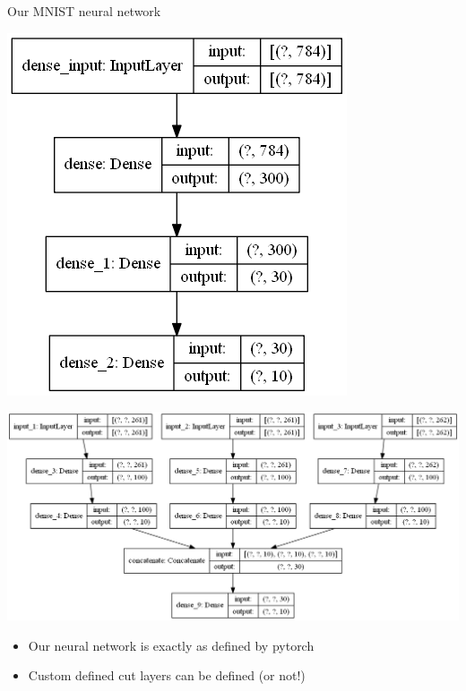 \documentclass[xcolor=dvipsnames]{beamer}
\begin{document}
\begin{frame}{Our MNIST neural network}
\begin{minipage}{.3\textwidth}
  \centering
  \includegraphics[width=1\linewidth]{images/combinedmodel.png}
  \label{fig:test1}
\end{minipage}%
\begin{minipage}{.7\textwidth}
  \centering
  \includegraphics[width=1\linewidth]{images/splitmodel.png}
  \label{fig:test2}
\end{minipage}
\begin{itemize}
  \item Our neural network is exactly as defined by pytorch
  \item Custom defined cut layers can be defined (or not!)
\end{itemize}

\end{frame}
\end{document}
